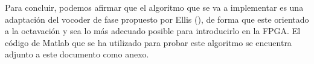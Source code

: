 Para concluir, podemos afirmar que el algoritmo que se va a implementar es una adaptación del vocoder de fase propuesto por Ellis (\cite{Ellis}), de forma que este orientado a la octavación y sea lo más adecuado posible para introducirlo en la FPGA. El código de Matlab que se ha utilizado para probar este algoritmo se encuentra adjunto a este documento como anexo.